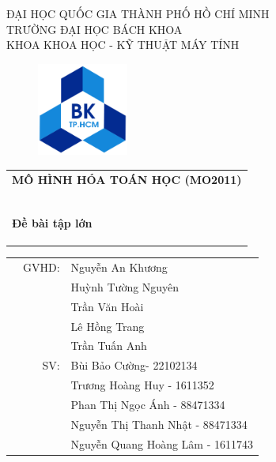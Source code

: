 \documentclass[a4paper]{article}
\begin{document}
\begin{titlepage}
\begin{center}
ĐẠI HỌC QUỐC GIA THÀNH PHỐ HỒ CHÍ MINH \\
TRƯỜNG ĐẠI HỌC BÁCH KHOA \\
KHOA KHOA HỌC - KỸ THUẬT MÁY TÍNH 
\end{center}

\vspace{1cm}

\begin{figure}[h!]
\begin{center}
\includegraphics[width=3cm]{hcmut.png}
\end{center}
\end{figure}

\vspace{1cm}


\begin{center}
\begin{tabular}{c}
\multicolumn{1}{l}{\textbf{{\Large MÔ HÌNH HÓA TOÁN HỌC (MO2011)}}}\\
~~\\
\hline
\\
\multicolumn{1}{l}{\textbf{{\Large Đề bài tập lớn}}}\\
\\
\textbf{{\large \centering {"Đặc tả Smart Contrast bằng Linear Logic"}}}\\
\\
\hline
\end{tabular}
\end{center}

\vspace{1cm}

\begin{table}[h]
\begin{tabular}{rrl}
\hspace{5 cm} & GVHD: & Nguyễn An Khương\\
&     & Huỳnh Tường Nguyên \\
&     & Trần Văn Hoài \\
&     & Lê Hồng Trang \\
&     & Trần Tuấn Anh \\
& SV: & Bùi Bảo Cường- 22102134 \\
& & Trương Hoàng Huy - 1611352 \\
& & Phan Thị Ngọc Ánh - 88471334 \\
& & Nguyễn Thị Thanh Nhật - 88471334 \\
& & Nguyễn Quang Hoàng Lâm - 1611743 \\
\end{tabular}
\end{table}


\end{titlepage}
\end{document}
